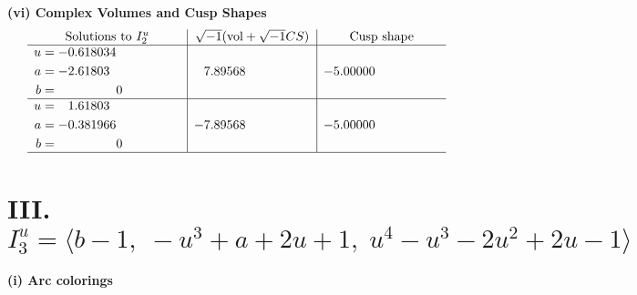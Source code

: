 \documentclass[1p]{elsarticle_modified}
\theoremstyle{definition}
\newcommand{\I}{\sqrt{-1}}
\begin{document}
\newpage\flushleft \textbf{(vi) Complex Volumes and Cusp Shapes}
$$\begin{array}{c|c|c}  
\text{Solutions to }I^u_{2}& \I (\text{vol} + \sqrt{-1}CS) & \text{Cusp shape}\\
 \hline 
\begin{aligned}
u &= -0.618034\phantom{ +0.000000I} \\
a &= -2.61803\phantom{ +0.000000I} \\
b &= \phantom{-0.000000 } 0\end{aligned}
 & \phantom{-}7.89568\phantom{ +0.000000I} & -5.00000\phantom{ +0.000000I} \\ \hline\begin{aligned}
u &= \phantom{-}1.61803\phantom{ +0.000000I} \\
a &= -0.381966\phantom{ +0.000000I} \\
b &= \phantom{-0.000000 } 0\end{aligned}
 & -7.89568\phantom{ +0.000000I} & -5.00000\phantom{ +0.000000I}\\
 \hline 
 \end{array}$$\newpage\newpage\renewcommand{\arraystretch}{1}
\centering \section*{III. $I^u_{3}= \langle b-1,\;- u^3+a+2 u+1,\;u^4- u^3-2 u^2+2 u-1 \rangle$}
\flushleft \textbf{(i) Arc colorings}\\
\end{document}

